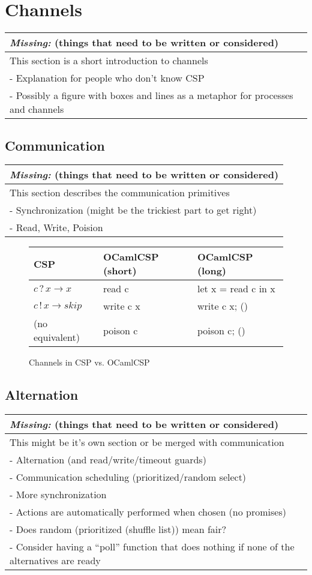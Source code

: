 \documentclass[11pt,oneside,a4paper]{article}
\newcommand{\missing}[1]{
\begin{tabular}{|p{11cm}|}
\hline
\emph{Missing:} {\scriptsize (things that need to be written or considered)} \\
\hline
#1
\hline
\end{tabular}
}
\begin{document}
\section{Channels}
\missing{
This section is a short introduction to channels \\
- Explanation for people who don't know CSP \\
- Possibly a figure with boxes and lines as a metaphor for processes and channels \\
}

\subsection{Communication}
\missing{
This section describes the communication primitives \\
- Synchronization (might be the trickiest part to get right) \\
- Read, Write, Poision \\
}

\begin{figure}[h]
\centering
\begin{tabular}{l|l|l}
CSP & OCamlCSP (short) & OCamlCSP (long) \\
\hline
$c\,?\,x \to x$ & read c & let x = read c in x \\
$c\,!\,x \to skip$ & write c x & write c x; () \\
(no equivalent) & poison c & poison c; () \\
\end{tabular}
\caption{Channels in CSP vs. OCamlCSP}
\label{channel-communication}
\end{figure}

\subsection{Alternation}
\missing{
This might be it's own section or be merged with communication \\
- Alternation (and read/write/timeout guards) \\
- Communication scheduling (prioritized/random select) \\
- More synchronization \\
- Actions are automatically performed when chosen (no promises) \\
- Does random (prioritized (shuffle list)) mean fair? \\
- Consider having a ``poll'' function that does nothing if none of the alternatives are ready \\
}
\end{document}
